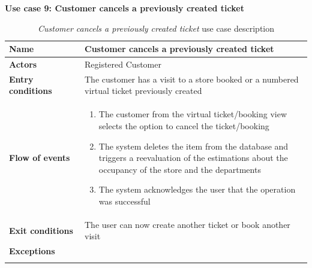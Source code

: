 \clearpage
\textbf{Use case 9: Customer cancels a previously created ticket}
\smallskip
{}
\begin{longtable}{p{0.25\linewidth}p{0.75\linewidth}}
    \toprule
    \textbf{Name}             & \textbf{Customer cancels a previously created ticket}                                      \\
    \midrule
    \textbf{Actors}           & Registered Customer                                                                        \\
    \midrule
    \textbf{Entry conditions} & The customer has a visit to a store booked or a numbered virtual ticket previously created \\
    \midrule
    \textbf{Flow of events}   &
    \begin{enumerate}
        \item The customer from the virtual ticket/booking view selects the option to cancel the ticket/booking
        \item The system deletes the item from the database and triggers a reevaluation of the estimations about the occupancy of the store and the departments
        \item The system acknowledges the user that the operation was successful
    \end{enumerate}                                                                                             \\
    \midrule
    \textbf{Exit conditions}  & The user can now create another ticket or book another visit                             \\
    \midrule
    \textbf{Exceptions}       &                                                                                            \\
    \bottomrule
    \caption{\emph{Customer cancels a previously created ticket} use case description}
\end{longtable}





